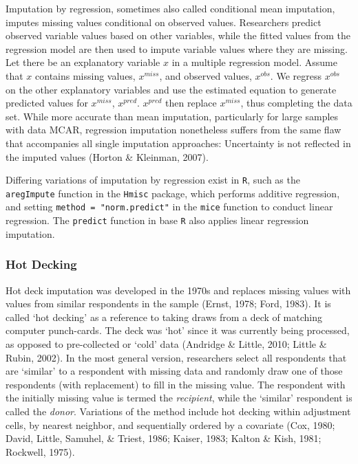 \documentclass[12pt,econ]{sources/authesis}
\begin{document}
Imputation by regression, sometimes also called conditional mean imputation, imputes missing values conditional on observed values. Researchers predict observed variable values based on other variables, while the fitted values from the regression model are then used to impute variable values where they are missing. Let there be an explanatory variable \(x\) in a multiple regression model. Assume that \(x\) contains missing values, \(x^{miss}\), and observed values, \(x^{obs}\). We regress \(x^{obs}\) on the other explanatory variables and use the estimated equation to generate predicted values for \(x^{miss}\), \(x^{pred}\). \(x^{pred}\) then replace \(x^{miss}\), thus completing the data set. While more accurate than mean imputation, particularly for large samples with data MCAR, regression imputation nonetheless suffers from the same flaw that accompanies all single imputation approaches: Uncertainty is not reflected in the imputed values (Horton \& Kleinman, 2007).

Differing variations of imputation by regression exist in \texttt{R}, such as the \texttt{aregImpute} function in the \texttt{Hmisc} package, which performs additive regression, and setting \texttt{method\ =\ "norm.predict"} in the \texttt{mice} function to conduct linear regression. The \texttt{predict} function in base \texttt{R} also applies linear regression imputation.

\hypertarget{ordmiss-theory-impute-hd}{%
\subsubsection{Hot Decking}\label{ordmiss-theory-impute-hd}}

Hot deck imputation was developed in the 1970s and replaces missing values with values from similar respondents in the sample (Ernst, 1978; Ford, 1983). It is called `hot decking' as a reference to taking draws from a deck of matching computer punch-cards. The deck was `hot' since it was currently being processed, as opposed to pre-collected or `cold' data (Andridge \& Little, 2010; Little \& Rubin, 2002). In the most general version, researchers select all respondents that are `similar' to a respondent with missing data and randomly draw one of those respondents (with replacement) to fill in the missing value. The respondent with the initially missing value is termed the \textit{recipient}, while the `similar' respondent is called the \textit{donor}. Variations of the method include hot decking within adjustment cells, by nearest neighbor, and sequentially ordered by a covariate (Cox, 1980; David, Little, Samuhel, \& Triest, 1986; Kaiser, 1983; Kalton \& Kish, 1981; Rockwell, 1975).
\end{document}
